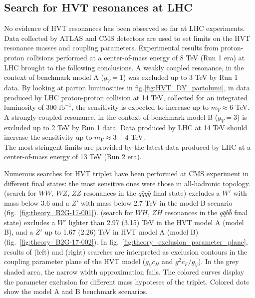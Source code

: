 \subsection{Search for HVT resonances at LHC}
\label{sec:theory_HVT_limits_LHC}
No evidence of HVT resonances has been observed so far at LHC experiments. Data collected by ATLAS and CMS detectors are used to set limits on the HVT resonance masses and coupling parameters. Experimental results from proton-proton collisions performed at a center-of-mass energy of 8 TeV (Run 1 era) at LHC brought to the following conclusions. A weakly coupled resonance, in the context of benchmark model A ($g_V = 1$) was excluded up to 3 TeV by Run 1 data. By looking at parton luminosities in fig.\ref{fig:HVT_DY_partolumi}, in data produced by LHC proton-proton collision at 14 TeV, collected for an integrated luminosity of 300 $\mbox{fb}^{-1}$, the sensitivity is expected to increase up to $m_V \approx 6$ TeV. A strongly coupled resonance, in the context of benchmark model B ($g_V = 3$) is excluded up to 2 TeV by Run 1 data. Data produced by LHC at 14 TeV should increase the sensitivity up to $m_V \approx 3-4$ TeV.\\
The most stringent limits are provided by the latest data produced by LHC at a center-of-mass energy of 13 TeV (Run 2 era).

\vspace*{1\baselineskip}

Numerous searches for HVT triplet have been performed at CMS experiment in different final states: the most sensitive ones were those in all-hadronic topology. \cite{Sirunyan:2017acf,bib:CMS-PAS-B2G-17-001} (search for $WW$, $WZ$, $ZZ$ resonances in the $q\bar{q}q\bar{q}$ final state) excludes a $W'$ with mass below 3.6 and a $Z'$ with mass below 2.7 TeV in the model B scenario (fig.~\ref{fig:theory_B2G-17-001}). \cite{CMS:2017eme,bib:CMS-PAS-B2G-17-002} (search for $WH$, $ZH$ resonances in the $q\bar{q} b \bar{b}$ final state) excludes a $W'$ lighter than 2.97 (3.15) TeV in the HVT model A (model B), and a $Z'$ up to 1.67 (2.26) TeV in HVT model A (model B) (fig.~\ref{fig:theory_B2G-17-002}). In fig.~\ref{fig:theory_exclusion_parameter_plane}, results of \cite{Sirunyan:2017acf,bib:CMS-PAS-B2G-17-001} (left) and \cite{CMS:2017eme,bib:CMS-PAS-B2G-17-002} (right) searches are interpreted as exclusion contours in the coupling parameter plane of the HVT model ($g_Vc_H$ and $g^2 c_F/g_V$). In the grey shaded area, the narrow width approximation fails. The colored curves display the parameter exclusion for different mass hypoteses of the triplet. Colored dots show the model A and B benchmark scenarios.

